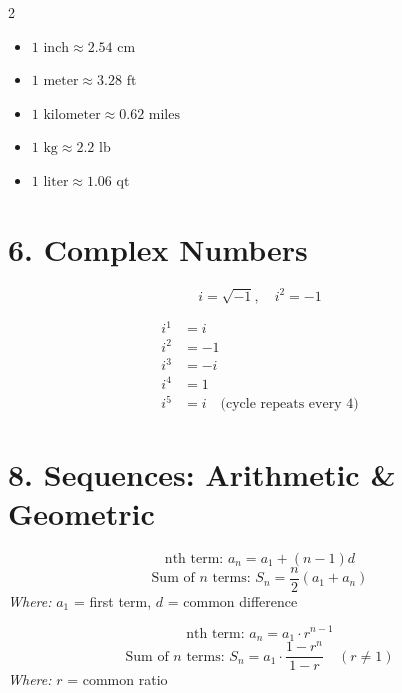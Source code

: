 \documentclass[12pt]{article}
\begin{document}
\begin{multicols}{2}
\begin{tcolorbox}[title=Metric to U.S. Customary (Approximate)]
\begin{itemize}[left=0pt]
  \item \( 1 \text{ inch} \approx 2.54 \text{ cm} \)
  \item \( 1 \text{ meter} \approx 3.28 \text{ ft} \)
  \item \( 1 \text{ kilometer} \approx 0.62 \text{ miles} \)
  \item \( 1 \text{ kg} \approx 2.2 \text{ lb} \)
  \item \( 1 \text{ liter} \approx 1.06 \text{ qt} \)
\end{itemize}
\end{tcolorbox}




\section*{6. Complex Numbers}

\begin{tcolorbox}[title=Definition of \(i\)]
\[
i = \sqrt{-1}, \quad i^2 = -1
\]
\end{tcolorbox}

\begin{tcolorbox}[title=Powers of \(i\) Cycle]
\[
\begin{aligned}
i^1 &= i \\
i^2 &= -1 \\
i^3 &= -i \\
i^4 &= 1 \\
i^5 &= i \quad \text{(cycle repeats every 4)}
\end{aligned}
\]


\end{tcolorbox}

\newpage
\section*{8. Sequences: Arithmetic \& Geometric}

\begin{tcolorbox}[title=Arithmetic Sequence]
\[
\text{nth term: } a_n = a_1 + (n - 1)d
\]
\[
\text{Sum of } n \text{ terms: } S_n = \frac{n}{2}(a_1 + a_n)
\]
\textit{Where: } \( a_1 \) = first term, \( d \) = common difference
\end{tcolorbox}

\begin{tcolorbox}[title=Geometric Sequence]
\[
\text{nth term: } a_n = a_1 \cdot r^{n-1}
\]
\[
\text{Sum of } n \text{ terms: } S_n = a_1 \cdot \frac{1 - r^n}{1 - r} \quad (r \neq 1)
\]
\textit{Where: } \( r \) = common ratio
\end{tcolorbox}



\end{multicols}
\end{document}
